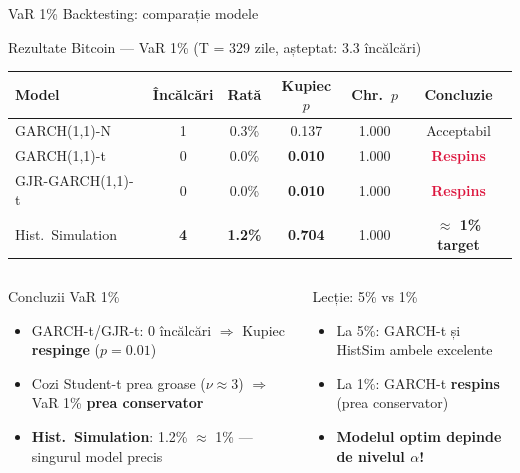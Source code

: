 \documentclass[9pt, aspectratio=169, t]{beamer}
\begin{document}
\begin{frame}{VaR 1\% Backtesting: comparație modele}
    \vspace{-3mm}
    {\footnotesize
    \begin{block}{Rezultate Bitcoin --- VaR 1\% (T = 329 zile, așteptat: 3.3 încălcări)}
        \begin{center}
        \begin{tabular}{lccccc}
            \toprule
            \textbf{Model} & \textbf{Încălcări} & \textbf{Rată} & \textbf{Kupiec $p$} & \textbf{Chr.\ $p$} & \textbf{Concluzie} \\
            \midrule
            GARCH(1,1)-N & 1 & 0.3\% & 0.137 & 1.000 & Acceptabil \\
            \rowcolor{Crimson!10} GARCH(1,1)-t & 0 & 0.0\% & \textbf{0.010} & 1.000 & \textcolor{Crimson}{\textbf{Respins}} \\
            \rowcolor{Crimson!10} GJR-GARCH(1,1)-t & 0 & 0.0\% & \textbf{0.010} & 1.000 & \textcolor{Crimson}{\textbf{Respins}} \\
            \rowcolor{Forest!15} Hist.\ Simulation & \textbf{4} & \textbf{1.2\%} & \textbf{0.704} & 1.000 & \textcolor{Forest}{\textbf{$\approx$ 1\% target}} \\
            \bottomrule
        \end{tabular}
        \end{center}
    \end{block}
    }
    \vspace{-1mm}
    \begin{columns}[T]
        \begin{exampleblock}{Concluzii VaR 1\%}
            \begin{itemize}\setlength{\itemsep}{0pt}
                \item GARCH-t/GJR-t: 0 încălcări $\Rightarrow$ Kupiec \textbf{respinge} ($p = 0.01$)
                \item Cozi Student-t prea groase ($\nu \approx 3$) $\Rightarrow$ VaR 1\% \textbf{prea conservator}
                \item \textbf{Hist.\ Simulation}: 1.2\% $\approx$ 1\% --- singurul model precis
            \end{itemize}
        \end{exampleblock}

        \begin{alertblock}{Lecție: 5\% vs 1\%}
            \begin{itemize}\setlength{\itemsep}{0pt}
                \item La 5\%: GARCH-t și HistSim ambele excelente
                \item La 1\%: GARCH-t \textbf{respins} (prea conservator)
                \item \textbf{Modelul optim depinde de nivelul $\alpha$!}
            \end{itemize}
        \end{alertblock}
    \end{columns}
\end{frame}
\end{document}
